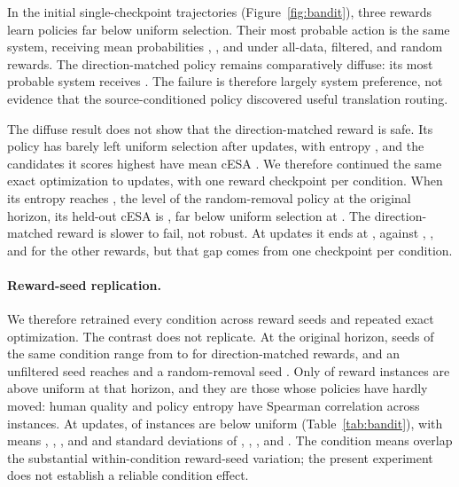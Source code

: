 \documentclass[11pt]{article}
\begin{document}
In the initial single-checkpoint trajectories (Figure~\ref{fig:bandit}), three
rewards learn policies far below uniform selection.  Their most probable action is the same system,
receiving mean probabilities \AllTopProbability{}, \FilteredTopProbability{},
and \RandomTopProbability{} under all-data, filtered, and random rewards.  The
direction-matched policy remains comparatively diffuse: its most probable
system receives \DirectionTopProbability{}.  The failure is therefore largely
system preference, not evidence that the source-conditioned policy discovered
useful translation routing.

The diffuse result does not show that the direction-matched reward is safe.  Its
policy has barely left uniform selection after \BanditUpdates{} updates, with
entropy \DirectionFrozenEntropy{}, and the candidates it scores highest have
mean cESA \DirectionProxyBest{}.  We therefore continued the same exact
optimization to \HorizonFinalStep{} updates, with one reward checkpoint per
condition.  When its entropy reaches \HorizonMatchedEntropy{}, the level of the
random-removal policy at the original horizon, its held-out cESA is
\DirectionHorizonMatched{}, far below uniform selection at \UniformCesa{}.  The
direction-matched reward is slower to fail, not robust.  At
\HorizonFinalStep{} updates it ends at \DirectionHorizonFinal{}, against
\AllHorizonFinal{}, \FilteredHorizonFinal{}, and \RandomHorizonFinal{} for the
other rewards, but that gap comes from one checkpoint per condition.

\paragraph{Reward-seed replication.}
We therefore retrained every condition across \SeedCount{} reward seeds and
repeated exact optimization.  The contrast does not replicate.  At the original
horizon, seeds of the same condition range from \DirectionSeedFrozenMin{} to
\DirectionSeedFrozenMax{} for direction-matched rewards, and an unfiltered seed
reaches \AllSeedFrozenMax{} and a random-removal seed \RandomSeedFrozenMax{}.
Only \SeedCellsAboveFrozen{} of \SeedCells{} reward instances are above uniform
at that horizon, and they are those whose policies have hardly moved: human
quality and policy entropy have Spearman correlation \SeedEntropySpearman{}
across instances.  At \HorizonFinalStep{} updates, \SeedCellsBelowFinal{} of
\SeedCells{} instances are below uniform (Table~\ref{tab:bandit}), with means
\AllSeedFinalMean{}, \FilteredSeedFinalMean{}, \RandomSeedFinalMean{}, and
\DirectionSeedFinalMean{} and standard deviations of
\AllSeedFinalSd{}, \FilteredSeedFinalSd{}, \RandomSeedFinalSd{}, and
\DirectionSeedFinalSd{}.  The condition means overlap the substantial
within-condition reward-seed variation; the present experiment does not
establish a reliable condition effect.
\end{document}
